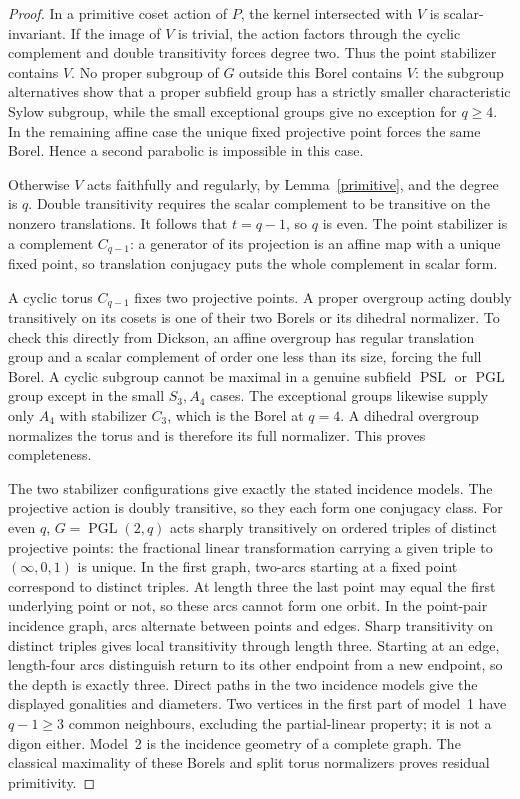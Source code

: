 \documentclass[11pt,a4paper]{article}
\newcommand{\PSL}{\operatorname{PSL}}\newcommand{\PGL}{\operatorname{PGL}}
\begin{document}
\begin{proof}
In a primitive coset action of $P$, the kernel intersected with $V$ is
scalar-invariant. If the image of $V$ is trivial, the action factors through
the cyclic complement and double transitivity forces degree two. Thus the
point stabilizer contains $V$. No proper subgroup of $G$ outside this Borel
contains $V$: the subgroup alternatives show that a proper subfield group
has a strictly smaller characteristic Sylow subgroup, while the small
exceptional groups give no exception for $q\ge4$. In the remaining affine
case the unique fixed projective point forces the same Borel. Hence a second
parabolic is impossible in this case.

Otherwise $V$ acts faithfully and regularly, by Lemma~\ref{primitive},
and the degree is $q$. Double transitivity requires the scalar complement
to be transitive on the nonzero translations. It follows that $t=q-1$,
so $q$ is even. The point stabilizer is a complement $C_{q-1}$: a generator
of its projection is an affine map with a unique fixed point, so translation
conjugacy puts the whole complement in scalar form.

A cyclic torus $C_{q-1}$ fixes two projective points. A proper overgroup
acting doubly transitively on its cosets is one of their two Borels or its
dihedral normalizer. To check this directly from Dickson, an affine overgroup
has regular translation group and a scalar complement of order one less
than its size, forcing the full Borel. A cyclic subgroup cannot be maximal
in a genuine subfield $\PSL$ or $\PGL$ group except in the small $S_3,A_4$
cases. The exceptional groups likewise supply only $A_4$ with stabilizer
$C_3$, which is the Borel at $q=4$. A dihedral overgroup normalizes the
torus and is therefore its full normalizer. This proves completeness.

The two stabilizer configurations give exactly the stated incidence models.
The projective action is doubly transitive, so they each form one conjugacy
class. For even $q$, $G=\PGL(2,q)$ acts sharply transitively on ordered
triples of distinct projective points: the fractional linear transformation
carrying a given triple to $(\infty,0,1)$ is unique. In the first graph,
two-arcs starting at a fixed point correspond to distinct triples. At length
three the last point may equal the first underlying point or not, so these
arcs cannot form one orbit. In the point-pair incidence graph, arcs alternate
between points and edges. Sharp transitivity on distinct triples gives
local transitivity through length three. Starting at an edge, length-four
arcs distinguish return to its other endpoint from a new endpoint, so the
depth is exactly three. Direct paths in the two incidence models give the
displayed gonalities and diameters. Two vertices in the first part of model~1
have $q-1\ge3$ common neighbours, excluding the partial-linear property;
it is not a digon either. Model~2 is the incidence geometry of a complete
graph. The classical maximality of these Borels and split torus normalizers
proves residual primitivity.
\end{proof}
\end{document}
